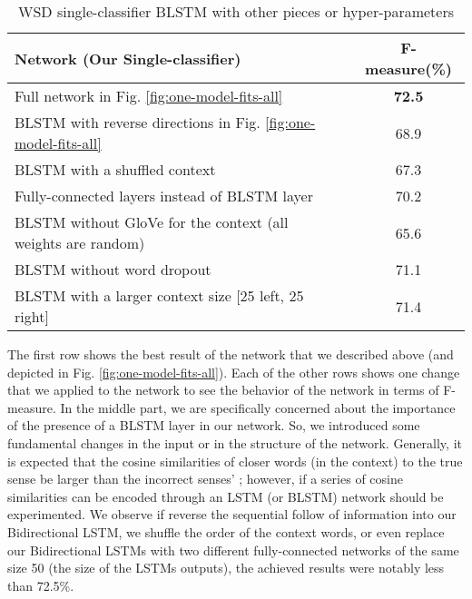 \documentclass{llncs}
\begin{document}
\begin{table}[]
	\centering
	\caption{WSD single-classifier BLSTM with other pieces or hyper-parameters}
	\label{table:within-our-model}
	\begin{tabular}{@{}lllc@{}}
		\toprule
		\textbf{Network (Our Single-classifier)}                 & \textbf{} & \textbf{} & \textbf{F-measure(\%)} \\ \midrule
		Full network in Fig. \ref{fig:one-model-fits-all}                                 &           &           & \textbf{72.5}      \\ \midrule
		BLSTM with reverse directions in Fig. \ref{fig:one-model-fits-all}                            &           &           & 68.9               \\
		BLSTM with a shuffled context                &           &           & 67.3               \\
		Fully-connected layers instead of BLSTM layer            &           &           & 70.2               \\ \midrule
		BLSTM without GloVe for the context (all weights are random)             &           &           & 65.6               \\
		BLSTM without word dropout                               &           &           & 71.1               \\
		BLSTM with a larger context size {[}25 left, 25 right{]} &           &           & 71.4               \\ \bottomrule
	\end{tabular}
\end{table}

The first row shows the best result of the network that we described above (and depicted in Fig. \ref{fig:one-model-fits-all}). Each of the other rows shows one change that we applied to the network to see the behavior of the network in terms of F-measure. In the middle part, we are specifically concerned about the importance of the presence of a BLSTM layer in our network. So, we introduced some fundamental changes in the input or in the structure of the network. Generally, it is expected that the cosine similarities of closer words (in the context) to the true sense be larger than the incorrect senses' \cite{mcinnes2013evaluating}; however, if a series of cosine similarities can be encoded through an LSTM (or BLSTM) network should be experimented. We observe if reverse the sequential follow of information into our Bidirectional LSTM, we shuffle the order of the context words, or even replace our Bidirectional LSTMs with two different fully-connected networks of the same size 50 (the size of the LSTMs outputs), the achieved results were notably less than 72.5\%.
\end{document}
